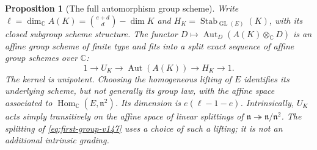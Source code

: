 \documentclass[11pt,reqno]{amsart}
\numberwithin{equation}{section}
\newtheorem{proposition}[theorem]{Proposition}
\theoremstyle{definition}\newtheorem{definition}[theorem]{Definition}
\theoremstyle{remark}\newtheorem{remark}[theorem]{Remark}
\newcommand{\C}{\mathbb C}\newcommand{\Q}{\mathbb Q}
\DeclareMathOperator{\Hom}{Hom}\DeclareMathOperator{\Tot}{Tot}
\begin{document}
\begin{proposition}[The full automorphism group scheme]
\label{prop:first-relation-group-v147}
Write \(\ell=\dim_{\C}A(K)=\binom{e+d}{d}-\dim K\) and
\(H_K=\operatorname{Stab}_{\operatorname{GL}(E)}(K)\), with its
closed subgroup scheme structure.  The functor
\(D\mapsto\operatorname{Aut}_{D}(A(K)\otimes_{\C}D)\) is an
affine group scheme of finite type and fits into a split exact sequence
of affine group schemes over \(\C\):
\begin{equation}\label{eq:first-group-v147}
 1\longrightarrow U_K\longrightarrow\operatorname{Aut}(A(K))
       \longrightarrow H_K\longrightarrow1.
\end{equation}
The kernel is unipotent.  Choosing the homogeneous lifting of \(E\)
identifies its underlying scheme, but not generally its group law,
with the affine space associated to \(\Hom_{\C}(E,\mathfrak n^2)\).
Its dimension is \(e(\ell-1-e)\).  Intrinsically, \(U_K\) acts
simply transitively on the affine space of linear splittings of
\(\mathfrak n\twoheadrightarrow\mathfrak n/\mathfrak n^2\).
The splitting of \eqref{eq:first-group-v147} uses a choice of such a
lifting; it is not an additional intrinsic grading.
\end{proposition}
\end{document}
